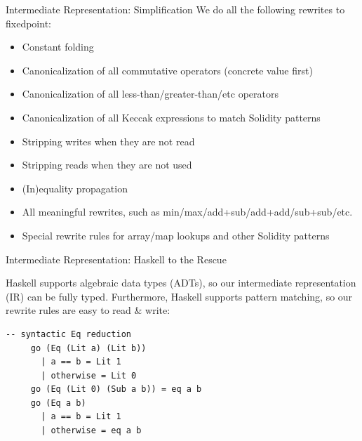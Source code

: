 \documentclass[aspectratio=169]{beamer}
\begin{document}
 \begin{frame}[fragile=singleslide]{Intermediate Representation: Simplification}
 We do all the following rewrites to fixedpoint:
 \begin{itemize}
 \item Constant folding
 \item Canonicalization of all commutative operators (concrete value first)
 \item Canonicalization of all less-than/greater-than/etc operators
 \item Canonicalization of all Keccak expressions to match Solidity patterns
 \item Stripping writes when they are not read
 \item Stripping reads when they are not used
 \item (In)equality propagation
 \item All meaningful rewrites, such as min/max/add+sub/add+add/sub+sub/etc.
 \item Special rewrite rules for array/map lookups and other Solidity patterns
 \end{itemize}
 \end{frame}

 \begin{frame}[fragile=singleslide]{Intermediate Representation: Haskell to the Rescue}

 Haskell supports algebraic data types (ADTs), so our intermediate representation (IR) can be fully typed. Furthermore, Haskell supports pattern matching, so our rewrite rules are easy to read \& write:
 \begin{Verbatim}[frame=single, framerule=0.2mm, framesep=2mm,fontsize=\small]
     -- syntactic Eq reduction
     go (Eq (Lit a) (Lit b))
       | a == b = Lit 1
       | otherwise = Lit 0
     go (Eq (Lit 0) (Sub a b)) = eq a b
     go (Eq a b)
       | a == b = Lit 1
       | otherwise = eq a b
 \end{Verbatim}
 \end{frame}

\end{document}

